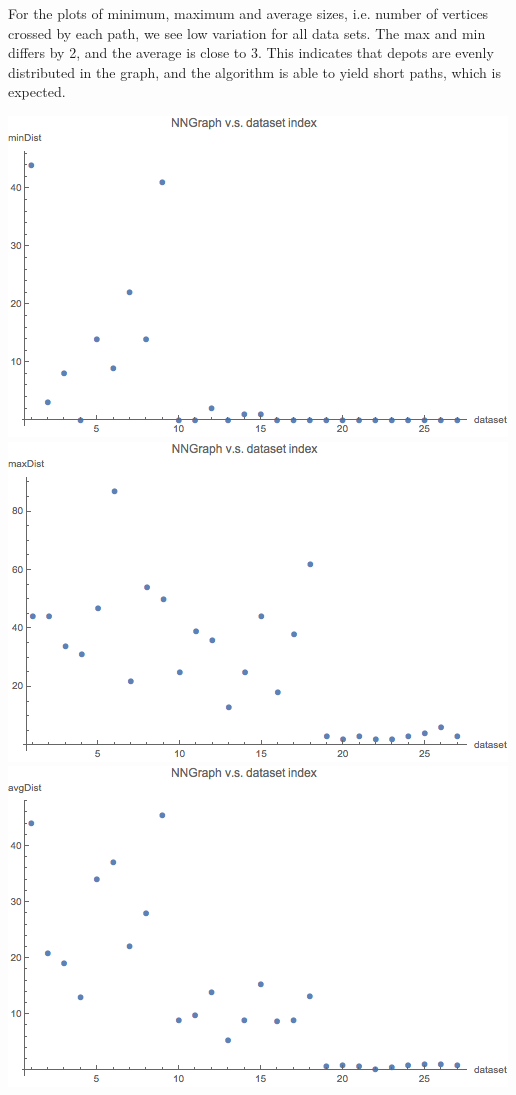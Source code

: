 \documentclass[12pt]{article}  %
\begin{document}
For the plots of minimum, maximum and average sizes, i.e. number of vertices crossed by each path, we see low variation for all data sets. The max and min differs by 2, and the average is close to 3. This indicates that depots are evenly distributed in the graph, and the algorithm is able to yield short paths, which is expected.

\begin{center}
\includegraphics[scale=0.6]{p4.png}
\includegraphics[scale=0.6]{p5.png}
\includegraphics[scale=0.6]{p6.png}\\

\end{center}
\end{document}
